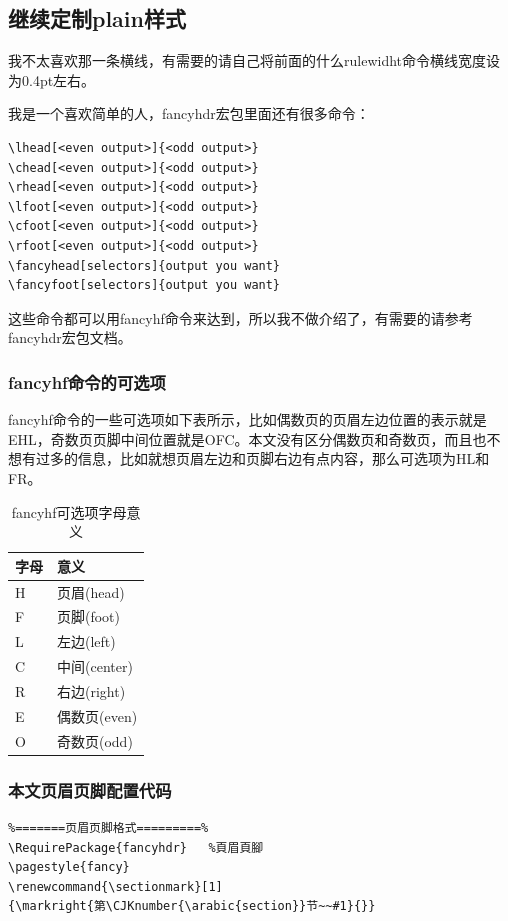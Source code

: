 \documentclass[12pt,oneside]{book}
\begin{document}
\begin{common-format}
\subsection{继续定制plain样式}
我不太喜欢那一条横线，有需要的请自己将前面的什么rulewidht命令横线宽度设为0.4pt左右。

我是一个喜欢简单的人，fancyhdr宏包里面还有很多命令：
\vspace{-20pt}
\begin{Verbatim}
\lhead[<even output>]{<odd output>}
\chead[<even output>]{<odd output>}
\rhead[<even output>]{<odd output>}
\lfoot[<even output>]{<odd output>}
\cfoot[<even output>]{<odd output>}
\rfoot[<even output>]{<odd output>}
\fancyhead[selectors]{output you want}
\fancyfoot[selectors]{output you want}
\end{Verbatim}
这些命令都可以用fancyhf命令来达到，所以我不做介绍了，有需要的请参考fancyhdr宏包文档。

\subsubsection{fancyhf命令的可选项}
fancyhf命令的一些可选项如下表所示，比如偶数页的页眉左边位置的表示就是EHL，奇数页页脚中间位置就是OFC。本文没有区分偶数页和奇数页，而且也不想有过多的信息，比如就想页眉左边和页脚右边有点内容，那么可选项为HL和FR。
\begin{table}[H]
\centering
\begin{tabular}{@{}ll@{}}
\toprule
字母 & 意义  \\ \midrule
H  & 页眉(head)  \\
F  & 页脚(foot)  \\
L  & 左边(left)  \\
C  & 中间(center)  \\
R  & 右边(right)  \\
E  & 偶数页(even) \\
O  & 奇数页(odd) \\ \bottomrule
\end{tabular}
\label{tab:fancyhf可选项字母意义}
\caption{fancyhf可选项字母意义}
\end{table}


\subsubsection{本文页眉页脚配置代码}
\begin{Verbatim}
%=======页眉页脚格式=========%
\RequirePackage{fancyhdr}   %頁眉頁腳
\pagestyle{fancy}
\renewcommand{\sectionmark}[1]
{\markright{第\CJKnumber{\arabic{section}}节~~#1}{}}


\end{Verbatim}
\end{common-format}
\end{document}
